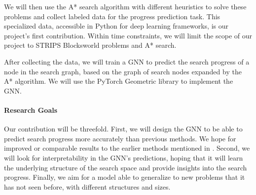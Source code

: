 \documentclass[12pt]{article}
\begin{document}
We will then use the A* search algorithm with different heuristics to solve these problems and collect labeled data for the progress prediction task. This specialized data, accessible in Python for deep learning frameworks, is our project's first contribution. Within time constraints, we will limit the scope of our project to STRIPS Blocksworld problems \cite{strips1971} and A* search.

After collecting the data, we will train a GNN to predict the search progress of a node in the search graph, based on the graph of search nodes expanded by the A* algorithm. We will use the PyTorch Geometric library to implement the GNN.

\paragraph{Research Goals} Our contribution will be threefold. First, we will design the GNN to be able to predict search progress more accurately than previous methods. We hope for improved or comparable results to the earlier methods mentioned in \citet{sudry2022learning}. Second, we will look for interpretability in the GNN's predictions, hoping that it will learn the underlying structure of the search space and provide insights into the search progress. Finally, we aim for a model able to generalize to new problems that it has not seen before, with different structures and sizes.




\end{document}
